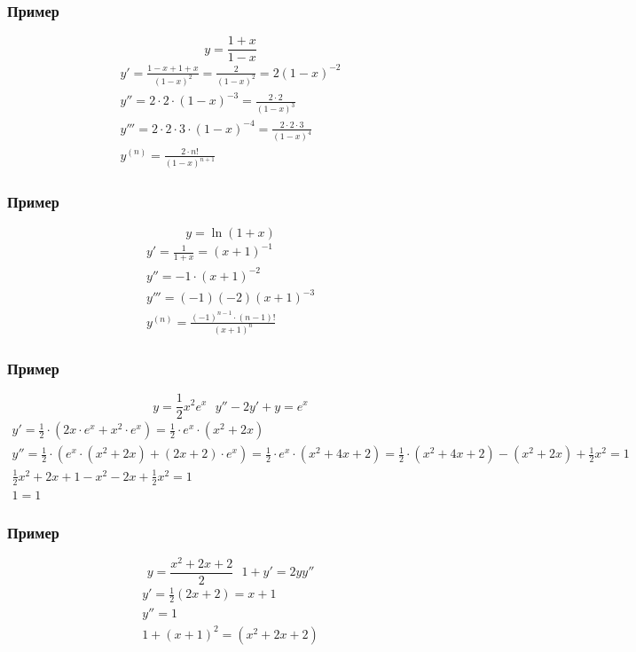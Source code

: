 \documentclass{article}
\begin{document}
\subsubsection{Пример}
\[
    y = \frac{1 + x}{1 - x}
\]
\begin{gather*}
    y'      = \frac{1 - x + 1 + x}{(1 - x)^2} = \frac{2}{(1 - x)^2} = 2(1 - x)^{-2} \\
    y''     = 2 \cdot 2 \cdot (1 - x)^{-3}  = \frac{2 \cdot 2}{(1 - x)^3} \\
    y'''    = 2 \cdot 2 \cdot 3 \cdot (1 - x)^{-4} = \frac{2 \cdot 2 \cdot 3}{(1 - x)^4} \\
    y^{(n)} = \frac{2 \cdot n!}{(1 - x)^{n + 1}}
\end{gather*}

\subsubsection{Пример}
\[
    y = \ln (1 + x)
\]
\begin{gather*}
    y'   = \frac{1}{1 + x} = (x + 1)^{-1} \\
    y''  = -1 \cdot (x + 1)^{-2} \\
    y''' = (-1)(-2)(x + 1)^{-3} \\
    y^{(n)} = \frac{(-1)^{n - 1} \cdot (n - 1)!}{(x + 1)^n}
\end{gather*}

\subsubsection{Пример}
\[
    y = \frac{1}{2} x^2 e^x ~~~ y'' - 2y' + y = e^x
\]
\begin{gather*}
    y' = \frac{1}{2} \cdot \left( 2x \cdot e^x + x^2 \cdot e^x \right) =
    \frac{1}{2} \cdot e^x \cdot \left( x^2 + 2x \right) \\
    y '' = \frac{1}{2} \cdot \left( e^x \cdot (x^2 + 2x) + (2x + 2) \cdot e^x \right) =
    \frac{1}{2} \cdot e^x \cdot \left( x^2 + 4x + 2 \right) =
    \frac{1}{2} \cdot \left( x^2 + 4x + 2 \right) - (x^2 + 2x) + \frac{1}{2} x^2 = 1 \\
    \frac{1}{2} x^2 + 2x + 1 - x^2 - 2x + \frac{1}{2} x^2 = 1 \\
    1 = 1
\end{gather*}

\subsubsection{Пример}
\[
    y = \frac{x^2 + 2x + 2}{2} ~~~ 1 + y' = 2yy''
\]
\begin{gather*}
    y' = \frac{1}{2} (2x + 2) = x + 1 \\
    y'' = 1 \\
    1 + (x + 1)^2 = (x^2 + 2x + 2) 
\end{gather*}
\end{document}
